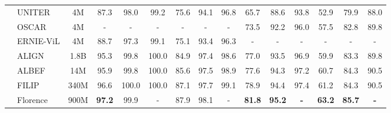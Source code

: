 \documentclass{article}
\begin{document}
\begin{table*}[]
{\begin{tabular}{@{}llccccccccccccc@{}}
 & \multicolumn{1}{l|}{UNITER}      & \multicolumn{1}{c|}{4M}       & 87.3          & 98.0           & \multicolumn{1}{c|}{99.2}           & 75.6          & 94.1          & \multicolumn{1}{c|}{96.8}          & 65.7          & 88.6          & \multicolumn{1}{c|}{93.8}          & 52.9                & 79.9          & 88.0          \\
\multicolumn{1}{l}{}                    & \multicolumn{1}{l|}{OSCAR}       & \multicolumn{1}{c|}{4M}       & -             & -              & \multicolumn{1}{c|}{-}              & -             & -             & \multicolumn{1}{c|}{-}             & 73.5          & 92.2          & \multicolumn{1}{c|}{96.0}          & 57.5                & 82.8          & 89.8          \\
\multicolumn{1}{l}{}                    & \multicolumn{1}{l|}{ERNIE-ViL}   & \multicolumn{1}{c|}{4M}       & 88.7          & 97.3           & \multicolumn{1}{c|}{99.1}           & 75.1          & 93.4          & \multicolumn{1}{c|}{96.3}          & -             & -             & \multicolumn{1}{c|}{-}             & -                   & -             & -             \\
\multicolumn{1}{l}{}                    & \multicolumn{1}{l|}{ALIGN}       & \multicolumn{1}{c|}{1.8B}     & 95.3          & 99.8           & \multicolumn{1}{c|}{100.0}          & 84.9          & 97.4          & \multicolumn{1}{c|}{98.6}          & 77.0          & 93.5          & \multicolumn{1}{c|}{96.9}          & 59.9                & 83.3          & 89.8          \\
\multicolumn{1}{l}{}                    & \multicolumn{1}{l|}{ALBEF}       & \multicolumn{1}{c|}{14M}      & 95.9          & 99.8           & \multicolumn{1}{c|}{100.0}          & 85.6          & 97.5          & \multicolumn{1}{c|}{98.9}          & 77.6          & 94.3          & \multicolumn{1}{c|}{97.2}          & 60.7                & 84.3          & 90.5          \\
\multicolumn{1}{l}{}                    & \multicolumn{1}{l|}{FILIP}       & \multicolumn{1}{c|}{340M}     & 96.6          & 100.0          & \multicolumn{1}{c|}{100.0}          & 87.1          & 97.7          & \multicolumn{1}{c|}{99.1}          & 78.9        & 94.4        & \multicolumn{1}{c|}{97.4}          & 61.2                & 84.3          & 90.5         \\
\multicolumn{1}{l}{}                    & \multicolumn{1}{l|}{Florence}       & \multicolumn{1}{c|}{900M}     & \textbf{97.2}         & 99.9          & \multicolumn{1}{c|}{-}          & 87.9          & 98.1       & \multicolumn{1}{c|}{-}          & \textbf{81.8}         & \textbf{95.2}     & \multicolumn{1}{c|}{\textbf{-}}          & \textbf{63.2}             & \textbf{85.7}  & \textbf{-  }        \\

\end{tabular}}
\end{table*}
\end{document}
